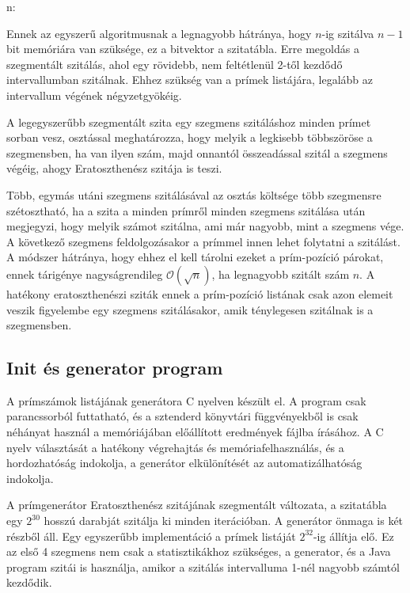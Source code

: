 \begin{algorithmic}[1]
\State n: 
\State {}
			\State {}
		\EndFor
	\EndIf
\EndFor
\end{algorithmic}

Ennek az egyszerű algoritmusnak a legnagyobb hátránya,
hogy $n$-ig szitálva $n-1$ bit memóriára van szüksége,
ez a bitvektor a szitatábla.
Erre megoldás a szegmentált szitálás, ahol egy rövidebb,
nem feltétlenül 2-től kezdődő intervallumban szitálnak.
Ehhez szükség van a prímek listájára, legalább az intervallum végének négyzetgyökéig.

A legegyszerűbb szegmentált szita egy szegmens szitáláshoz
minden prímet sorban vesz, osztással meghatározza, hogy melyik a legkisebb
többszöröse a szegmensben, ha van ilyen szám,
majd onnantól összeadással szitál a szegmens végéig,
ahogy Eratoszthenész szitája is teszi.

Több, egymás utáni szegmens szitálásával az osztás
költsége több szegmensre szétosztható, ha a szita
a minden prímről minden szegmens szitálása után megjegyzi,
hogy melyik számot szitálna, ami már nagyobb, mint a szegmens vége.
A következő szegmens feldolgozásakor a prímmel innen lehet folytatni a szitálást.
A módszer hátránya, hogy ehhez el kell tárolni ezeket a prím-pozíció párokat,
ennek tárigénye nagyságrendileg $\mathcal{O}(\sqrt{n})$, ha legnagyobb
szitált szám $n$.
A hatékony eratoszthenészi sziták ennek a prím-pozíció listának
csak azon elemeit veszik figyelembe egy szegmens szitálásakor,
amik ténylegesen szitálnak is a szegmensben.

\subsection{Init és generator program}

A prímszámok listájának generátora C nyelven készült el.
A program csak parancssorból futtatható, és a sztenderd könyvtári függvényekből
is csak néhányat használ a memóriájában előállított eredmények fájlba írásához.
A C nyelv választását a hatékony végrehajtás és memóriafelhasználás, és
a hordozhatóság indokolja, a generátor elkülönítését az automatizálhatóság indokolja.

A prímgenerátor Eratoszthenész szitájának szegmentált változata,
a szitatábla egy $2^{30}$ hosszú darabját szitálja ki minden iterációban.
A generátor önmaga is két részből áll.
Egy egyszerűbb implementáció a prímek listáját $2^{32}$-ig állítja elő.
Ez az első 4 szegmens nem csak a statisztikákhoz szükséges,
a generator, és a Java program szitái is használja,
amikor a szitálás intervalluma 1-nél nagyobb számtól kezdődik.

